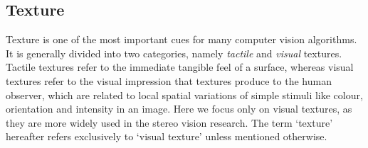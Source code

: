 





\subsection{Texture}
Texture is one of the most important cues for many computer vision algorithms. It is generally divided into two categories, namely \textit{tactile} and \textit{visual} textures. Tactile textures refer to the immediate tangible feel of a surface, whereas visual textures refer to the visual impression that textures produce to the human observer, which are related to local spatial variations of simple stimuli like colour, orientation and intensity in an image. Here we focus only on visual textures, as they are more widely used in the stereo vision research. The term `texture' hereafter refers exclusively to `visual texture' unless mentioned otherwise.

